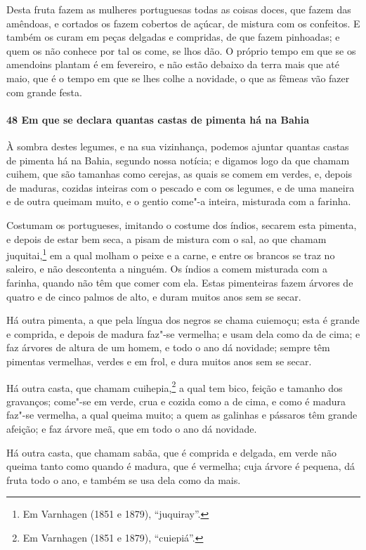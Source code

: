 Desta fruta fazem as mulheres portuguesas todas as coisas doces, que fazem das amêndoas, e
cortados os fazem cobertos de açúcar, de mistura com os confeitos. E também os curam em
peças delgadas e compridas, de que fazem pinhoadas; e quem os não conhece por tal os come,
se lhos dão. O próprio tempo em que se os amendoins plantam é em fevereiro, e não estão
debaixo da terra mais que até maio, que é o tempo em que se lhes colhe a novidade, o que
as fêmeas vão fazer com grande festa.

\paragraph{48 Em que se declara quantas castas de pimenta há na Bahia}

À sombra destes legumes, e na sua vizinhança, podemos ajuntar quantas castas de pimenta há
na Bahia, segundo nossa notícia; e digamos logo da que chamam cuihem, que são tamanhas
como cerejas, as quais se comem em verdes, e, depois de maduras, cozidas inteiras com o
pescado e com os legumes, e de uma maneira e de outra queimam muito, e o gentio come"-a
inteira, misturada com a farinha.

Costumam os portugueses, imitando o costume dos índios, secarem esta pimenta, e depois de
estar bem seca, a pisam de mistura com o sal, ao que chamam juquitai,\footnote{ Em
Varnhagen (1851 e 1879), ``juquiray''.} em a qual molham o peixe e a carne, e entre os
brancos se traz no saleiro, e não descontenta a ninguém. Os índios a comem misturada com a
farinha, quando não têm que comer com ela. Estas pimenteiras fazem árvores de quatro e de
cinco palmos de alto, e duram muitos anos sem se secar.

Há outra pimenta, a que pela língua dos negros se chama cuiemoçu; esta é grande e
comprida, e depois de madura faz"-se vermelha; e usam dela como da de cima; e faz árvores
de altura de um homem, e todo o ano dá novidade; sempre têm pimentas vermelhas, verdes e
em frol, e dura muitos anos sem se secar.

Há outra casta, que chamam cuihepia,\footnote{ Em Varnhagen (1851 e 1879), ``cuiepiá''.} a
qual tem bico, feição e tamanho dos gravanços; come"-se em verde, crua e cozida como a de
cima, e como é madura faz"-se vermelha, a qual queima muito; a quem as galinhas e pássaros
têm grande afeição; e faz árvore meã, que em todo o ano dá novidade.

Há outra casta, que chamam sabãa, que é comprida e delgada, em verde não queima tanto como
quando é madura, que é vermelha; cuja árvore é pequena, dá fruta todo o ano, e também se
usa dela como da mais.

